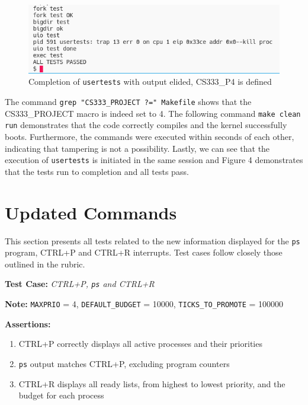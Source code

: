 \documentclass[11pt,letterpaper]{report}
\newcommand{\code}[1]{\colorbox{codegray}{\texttt{#1}}}
\begin{document}
{  \begin{figure}[h!]
	\centering
	\includegraphics[width=1\linewidth]{compilation2-usertests2.png}
	\caption[img]{Completion of \code{usertests} with output elided, CS333\_P4 is defined}
	\label{fig:P1compileP0-1}
  \end{figure}

  The command \code{grep "CS333\_PROJECT ?=" Makefile} shows that the CS333\_PROJECT macro
  is indeed set to 4. The following command \code{make clean run} demonstrates that the code
  correctly compiles and the kernel successfully boots. Furthermore, the commands were executed
  within seconds of each other, indicating that tampering is not a possibility. Lastly, we can
  see that the execution of \code{usertests} is initiated in the same session and Figure 4
  demonstrates that the tests run to completion and all tests pass. \\
  
  \pagebreak

  \section*{Updated Commands}
  This section presents all tests related to the new information displayed for the 
  \code{ps} program, CTRL+P and CTRL+R interrupts. Test cases follow closely those outlined in the rubric. \hfill \break
  
  \noindent\textbf{Test Case:} \emph{CTRL+P, \code{ps} and CTRL+R}
  
  \noindent\textbf{Note:} \code{MAXPRIO} = 4, \code{DEFAULT\_BUDGET} = 10000, \code{TICKS\_TO\_PROMOTE} = 100000

  \noindent\textbf{Assertions:}
  \begin{enumerate}[]
  \item CTRL+P correctly displays all active processes and their priorities
  \item \code{ps} output matches CTRL+P, excluding program counters
  \item CTRL+R displays all ready lists, from highest to lowest priority, and the budget for each process
  \end{enumerate}  
  
}
\end{document}
